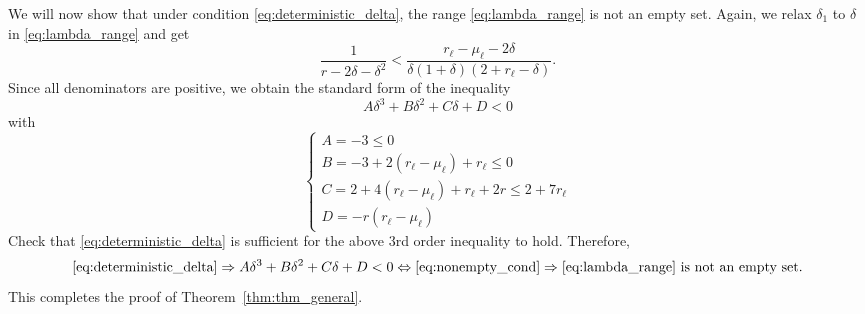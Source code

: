 \documentclass{ctexart}
\begin{document}
We will now show that under condition \eqref{eq:deterministic_delta}, the range \eqref{eq:lambda_range} is not an empty set. Again, we relax $\delta_1$ to $\delta$ in \eqref{eq:lambda_range} and get
\begin{equation}\label{eq:nonempty_cond}
  \frac{1}{r - 2\delta-\delta^2}< \frac{r_{\ell}-\mu_{\ell}-2\delta}{\delta(1+\delta)(2+r_{\ell}-\delta)}.
\end{equation}
Since all denominators are positive, we obtain the standard form of the inequality
$$ A\delta^3+B\delta^2+C\delta+D<0 $$ with
$$
\begin{cases}
A=-3\leq 0\\
B=-3+2(r_\ell-\mu_\ell) + r_\ell \leq 0\\%
C=2+4(r_{\ell}-\mu_{\ell})+r_\ell+2r \leq 2+7r_{\ell}\\%
D=-r(r_{\ell}-\mu_{\ell})
\end{cases}
$$
Check that \eqref{eq:deterministic_delta} is sufficient for the above $3$rd order inequality to hold. Therefore,
$$\eqref{eq:deterministic_delta}\Rightarrow A\delta^3+B\delta^2+C\delta+D<0 \Leftrightarrow \eqref{eq:nonempty_cond}
\Rightarrow \text{\eqref{eq:lambda_range} is not an empty set.}$$
This completes the proof of Theorem~\ref{thm:thm_general}.
\end{document}
